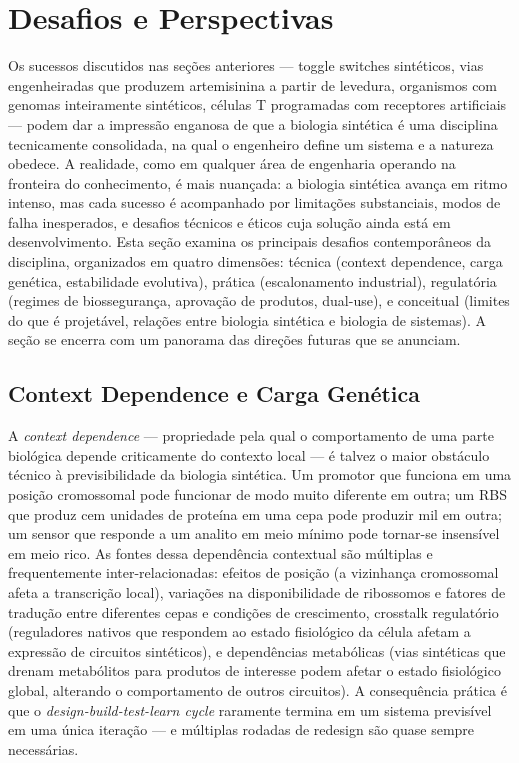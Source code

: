 \section{Desafios e Perspectivas}
\label{sec:14-desafios}

Os sucessos discutidos nas seções anteriores --- toggle switches sintéticos, vias engenheiradas que produzem artemisinina a partir de levedura, organismos com genomas inteiramente sintéticos, células T programadas com receptores artificiais --- podem dar a impressão enganosa de que a biologia sintética é uma disciplina tecnicamente consolidada, na qual o engenheiro define um sistema e a natureza obedece. A realidade, como em qualquer área de engenharia operando na fronteira do conhecimento, é mais nuançada: a biologia sintética avança em ritmo intenso, mas cada sucesso é acompanhado por limitações substanciais, modos de falha inesperados, e desafios técnicos e éticos cuja solução ainda está em desenvolvimento. Esta seção examina os principais desafios contemporâneos da disciplina, organizados em quatro dimensões: técnica (context dependence, carga genética, estabilidade evolutiva), prática (escalonamento industrial), regulatória (regimes de biossegurança, aprovação de produtos, dual-use), e conceitual (limites do que é projetável, relações entre biologia sintética e biologia de sistemas). A seção se encerra com um panorama das direções futuras que se anunciam.

\subsection{Context Dependence e Carga Genética}

A \emph{context dependence} --- propriedade pela qual o comportamento de uma parte biológica depende criticamente do contexto local --- é talvez o maior obstáculo técnico à previsibilidade da biologia sintética. Um promotor que funciona em uma posição cromossomal pode funcionar de modo muito diferente em outra; um RBS que produz cem unidades de proteína em uma cepa pode produzir mil em outra; um sensor que responde a um analito em meio mínimo pode tornar-se insensível em meio rico. As fontes dessa dependência contextual são múltiplas e frequentemente inter-relacionadas: efeitos de posição (a vizinhança cromossomal afeta a transcrição local), variações na disponibilidade de ribossomos e fatores de tradução entre diferentes cepas e condições de crescimento, crosstalk regulatório (reguladores nativos que respondem ao estado fisiológico da célula afetam a expressão de circuitos sintéticos), e dependências metabólicas (vias sintéticas que drenam metabólitos para produtos de interesse podem afetar o estado fisiológico global, alterando o comportamento de outros circuitos). A consequência prática é que o \emph{design-build-test-learn cycle} raramente termina em um sistema previsível em uma única iteração --- e múltiplas rodadas de redesign são quase sempre necessárias.

